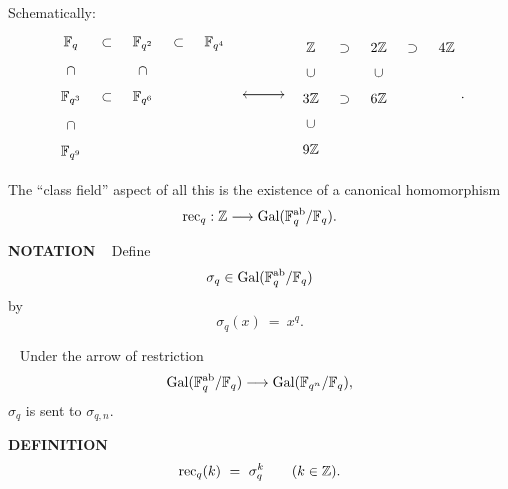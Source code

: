 Schematically:\\


\[
\begin{tikzcd}[sep=tiny]
{\F_q} &{\subset} &{\F_{q^2}} &{\subset} &{\F_{q^4}}\\
{\cap} &&{\cap}\\
{\F_{q^3}} &{\subset} &{\F_{q^6}}\\
{\cap}\\
{\F_{q^9}}
\end{tikzcd}
\begin{tikzcd}[sep=tiny]
\\
\\
{ } \ar{rrrrr} &&&&&{} \ar{lllll}
\\
\\
\end{tikzcd}
\begin{tikzcd}[sep=tiny]
{\Z} &{\supset} &{2\Z} &{\supset} &{4\Z}\\
{\cup} &&{\cup}\\
{3\Z} &{\supset} &{6\Z}\\
{\cup}\\
{9\Z}
\end{tikzcd}
.
\]

The ``class field'' aspect of all this is the existence of a canonical homomorphism
\[
\text{rec}_q:\mathbb{Z} \longrightarrow \text{Gal}(\mathbb{F}_q^{\text{ab}} / \mathbb{F}_q).
\]

\vspace{0.1cm}

\begin{x}{\small\bf NOTATION} \ %
Define
\[
\sigma_q \in \text{Gal}(\mathbb{F}_q^{\text{ab}} / \mathbb{F}_q)
\]
by 
\[
\sigma_q(x) \ = \ x^q.
\]
\end{x}

\vspace{0.2cm}

\begin{x}{\small\bf {}} \ %
Under the arrow of restriction
\[
\text{Gal}(\mathbb{F}_q^{\text{ab}} / \mathbb{F}_q) \longrightarrow \text{Gal}(\mathbb{F}_{q^n} / \mathbb{F}_q),
\]
$\sigma_q$ is sent to $\sigma_{q,n}$.
\end{x}

\vspace{0.1cm}

\begin{x}{\small\bf DEFINITION} \ %
\[
\text{rec}_q(k) \ = \ \sigma_q^k \qquad (k \in \mathbb{Z}).
\]
\end{x}

\vspace{0.1cm}

